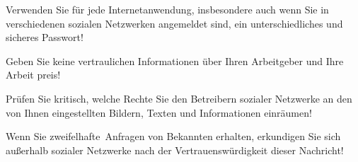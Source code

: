 \item Verwenden Sie für jede Internetanwendung, insbesondere auch wenn Sie in verschiedenen sozialen Netzwerken angemeldet sind, ein unterschiedliches und sicheres Passwort!
\item Geben Sie keine vertraulichen Informationen über Ihren Arbeitgeber und Ihre Arbeit preis!
\item Prüfen Sie kritisch, welche Rechte Sie den Betreibern sozialer Netzwerke an den von Ihnen eingestellten Bildern, Texten und Informationen einräumen!
\item Wenn Sie \glqq zweifelhafte\grqq\ Anfragen von Bekannten erhalten, erkundigen Sie sich außerhalb sozialer Netzwerke nach der Vertrauenswürdigkeit dieser Nachricht!